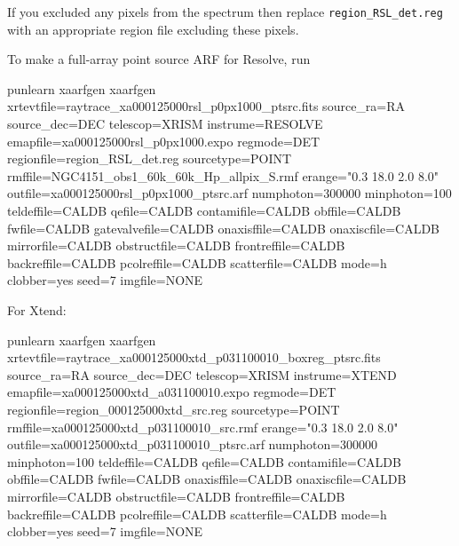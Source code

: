 \documentclass[
  letterpaper,
  DIV=11,
  numbers=noendperiod]{scrreprt}
\newenvironment{Shaded}{\begin{snugshade}}{\end{snugshade}}
\newcommand{\ExtensionTok}[1]{\textcolor[rgb]{0.00,0.23,0.31}{#1}}
\newcommand{\NormalTok}[1]{\textcolor[rgb]{0.00,0.23,0.31}{#1}}
\newcommand{\StringTok}[1]{\textcolor[rgb]{0.13,0.47,0.30}{#1}}
\begin{document}
\begin{tcolorbox}[enhanced jigsaw, arc=.35mm, bottomrule=.15mm, bottomtitle=1mm, breakable, colback=white, colbacktitle=quarto-callout-note-color!10!white, colframe=quarto-callout-note-color-frame, coltitle=black, left=2mm, leftrule=.75mm, opacityback=0, opacitybacktitle=0.6, rightrule=.15mm, title=\textcolor{quarto-callout-note-color}{\faInfo}\hspace{0.5em}{Note}, titlerule=0mm, toprule=.15mm, toptitle=1mm]

If you excluded any pixels from the spectrum then replace
\texttt{region\_RSL\_det.reg} with an appropriate region file excluding
these pixels.

\end{tcolorbox}

To make a full-array point source ARF for Resolve, run

\begin{Shaded}
\begin{Highlighting}[]
\ExtensionTok{punlearn}\NormalTok{ xaarfgen}
\ExtensionTok{xaarfgen}\NormalTok{ xrtevtfile=raytrace\_xa000125000rsl\_p0px1000\_ptsrc.fits source\_ra=RA source\_dec=DEC telescop=XRISM instrume=RESOLVE emapfile=xa000125000rsl\_p0px1000.expo regmode=DET regionfile=region\_RSL\_det.reg sourcetype=POINT rmffile=NGC4151\_obs1\_60k\_60k\_Hp\_allpix\_S.rmf erange=}\StringTok{"0.3 18.0 2.0 8.0"}\NormalTok{ outfile=xa000125000rsl\_p0px1000\_ptsrc.arf numphoton=300000 minphoton=100 teldeffile=CALDB qefile=CALDB contamifile=CALDB obffile=CALDB fwfile=CALDB gatevalvefile=CALDB onaxisffile=CALDB onaxiscfile=CALDB mirrorfile=CALDB obstructfile=CALDB frontreffile=CALDB backreffile=CALDB pcolreffile=CALDB scatterfile=CALDB mode=h clobber=yes seed=7 imgfile=NONE}
\end{Highlighting}
\end{Shaded}

For Xtend:

\begin{Shaded}
\begin{Highlighting}[]
\ExtensionTok{punlearn}\NormalTok{ xaarfgen}
\ExtensionTok{xaarfgen}\NormalTok{ xrtevtfile=raytrace\_xa000125000xtd\_p031100010\_boxreg\_ptsrc.fits source\_ra=RA source\_dec=DEC telescop=XRISM instrume=XTEND emapfile=xa000125000xtd\_a031100010.expo regmode=DET regionfile=region\_000125000xtd\_src.reg sourcetype=POINT rmffile=xa000125000xtd\_p031100010\_src.rmf erange=}\StringTok{"0.3 18.0 2.0 8.0"}\NormalTok{ outfile=xa000125000xtd\_p031100010\_ptsrc.arf numphoton=300000 minphoton=100 teldeffile=CALDB qefile=CALDB contamifile=CALDB obffile=CALDB fwfile=CALDB onaxisffile=CALDB onaxiscfile=CALDB mirrorfile=CALDB obstructfile=CALDB frontreffile=CALDB backreffile=CALDB pcolreffile=CALDB scatterfile=CALDB mode=h clobber=yes seed=7 imgfile=NONE}
\end{Highlighting}
\end{Shaded}
\end{document}

